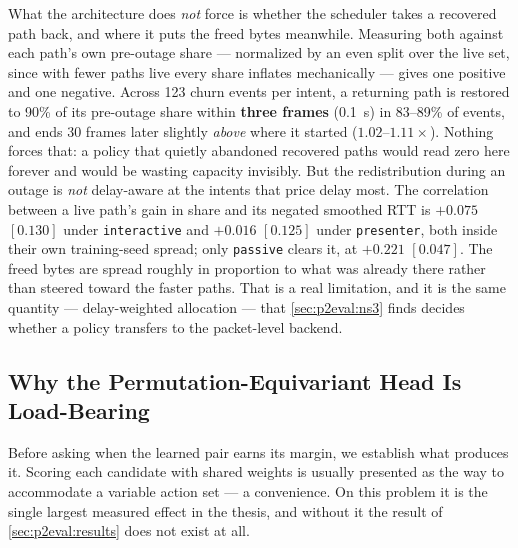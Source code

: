 What the architecture does \emph{not} force is whether the scheduler takes a recovered path back, and
where it puts the freed bytes meanwhile. Measuring both against each path's own pre-outage share ---
normalized by an even split over the live set, since with fewer paths live every share inflates
mechanically --- gives one positive and one negative. Across 123 churn events per intent, a returning
path is restored to 90\% of its pre-outage share within \textbf{three frames} (\SI{0.1}{\second}) in
83--89\% of events, and ends 30 frames later slightly \emph{above} where it started
($1.02$--$1.11\times$). Nothing forces that: a policy that quietly abandoned recovered paths would read
zero here forever and would be wasting capacity invisibly. But the redistribution during an outage is
\emph{not} delay-aware at the intents that price delay most. The correlation between a live path's gain
in share and its negated smoothed RTT is $+0.075$ $[0.130]$ under \texttt{interactive} and $+0.016$
$[0.125]$ under \texttt{presenter}, both inside their own training-seed spread; only \texttt{passive}
clears it, at $+0.221$ $[0.047]$. The freed bytes are spread roughly in proportion to what was already
there rather than steered toward the faster paths. That is a real limitation, and it is the same
quantity --- delay-weighted allocation --- that \cref{sec:p2eval:ns3} finds decides whether a policy
transfers to the packet-level backend.


\subsection{Why the Permutation-Equivariant Head Is Load-Bearing}
\label{sec:p2eval:head}
\label{sec:p2eval:pathcount}

Before asking when the learned pair earns its margin, we establish what produces it. Scoring each
candidate with shared weights is usually presented as the way to accommodate a variable action set ---
a convenience. On this problem it is the single largest measured effect in the thesis, and without it
the result of \cref{sec:p2eval:results} does not exist at all.

